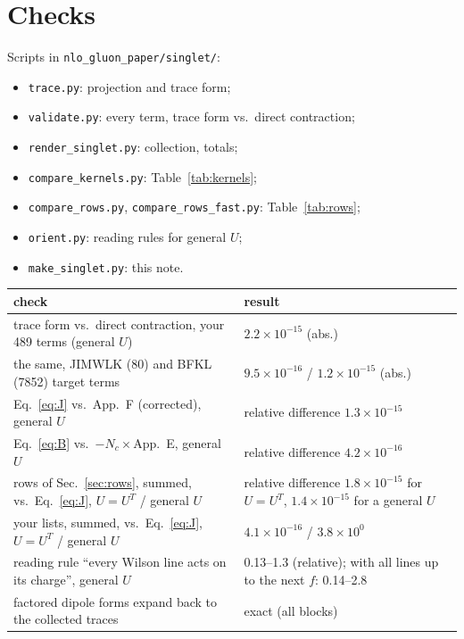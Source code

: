 \documentclass[10pt]{article}
\numberwithin{equation}{section}
\begin{document}
\section{Checks}\label{app:checks}
Scripts in \texttt{nlo\_gluon\_paper/singlet/}:
\begin{itemize}
\item \texttt{trace.py}: projection and trace form;
\item \texttt{validate.py}: every term, trace form vs.\ direct contraction;
\item \texttt{render\_singlet.py}: collection, totals;
\item \texttt{compare\_kernels.py}: Table~\ref{tab:kernels};
\item \texttt{compare\_rows.py}, \texttt{compare\_rows\_fast.py}: Table~\ref{tab:rows};
\item \texttt{orient.py}: reading rules for general $U$;
\item \texttt{make\_singlet.py}: this note.
\end{itemize}
\begin{table}[H]\centering\small
\begin{tabular}{@{}p{}p{}@{}}\toprule
check & result\\\midrule
trace form vs.\ direct contraction, your 489 terms (general $U$) & $2.2\times10^{-15}$ (abs.)\\
the same, JIMWLK (80) and BFKL (7852) target terms & $9.5\times10^{-16}$ / $1.2\times10^{-15}$ (abs.)\\
Eq.~\eqref{eq:J} vs.\ App.~F (corrected), general $U$ & relative difference $1.3\times10^{-15}$\\
Eq.~\eqref{eq:B} vs.\ $-N_c\times$App.~E, general $U$ & relative difference $4.2\times10^{-16}$\\
rows of Sec.~\ref{sec:rows}, summed, vs.\ Eq.~\eqref{eq:J}, $U=U^T$ / general $U$ & relative difference $1.8\times10^{-15}$ for $U=U^T$, $1.4\times10^{-15}$ for a general $U$\\
your lists, summed, vs.\ Eq.~\eqref{eq:J}, $U=U^T$ / general $U$ & $4.1\times10^{-16}$ / $3.8\times10^{0}$\\
reading rule ``every Wilson line acts on its charge'', general $U$ & 0.13--1.3 (relative); with all lines up to the next $f$: 0.14--2.8\\
factored dipole forms expand back to the collected traces & exact (all blocks)\\\bottomrule
\end{tabular}
\end{table}
\end{document}
